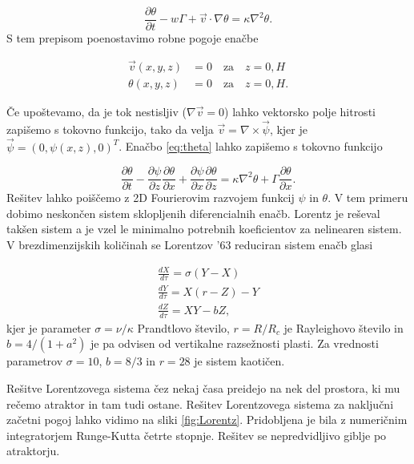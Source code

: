 \documentclass[slovene,11pt,a4paper]{article}
\begin{document}
\begin{equation}
    \frac{\partial \theta}{\partial t} - w\Gamma + \vec{v} \cdot \nabla \theta = \kappa \nabla^2 \theta.
    \label{eq:theta}
\end{equation}
S tem prepisom poenostavimo robne pogoje enačbe

\begin{eqnarray}
    \vec{v}(x, y, z) &= 0 \quad \text{za} \quad z = 0, H \\
    \theta (x, y, z) &= 0 \quad \text{za} \quad z = 0, H.
\end{eqnarray}

Če upoštevamo, da je tok nestisljiv ($\nabla \vec{v} = 0$) lahko vektorsko polje hitrosti zapišemo s tokovno funkcijo, tako da velja $\vec{v} = \nabla \times \vec{\psi}$, kjer je $\vec{\psi} = (0, \psi (x, z), 0)^T$. Enačbo \ref{eq:theta} lahko zapišemo s tokovno funkcijo

\begin{equation}
    \frac{\partial \theta}{\partial t} - \frac{\partial \psi}{\partial z} \frac{\partial \theta}{\partial x} + \frac{\partial \psi}{\partial x} \frac{\partial \theta}{\partial z} = \kappa \nabla^2 \theta + \Gamma \frac{\partial \theta}{\partial x}.
\end{equation}
Rešitev lahko poiščemo z 2D Fourierovim razvojem funkcij $\psi$ in $\theta$. V tem primeru dobimo neskončen sistem sklopljenih diferencialnih enačb. Lorentz je reševal takšen sistem a je vzel le minimalno potrebnih koeficientov za nelinearen sistem. V brezdimenzijskih količinah se Lorentzov '63 reduciran sistem enačb glasi

\begin{eqnarray}
    \frac{dX}{d \tau} = \sigma (Y - X) \\
    \frac{dY}{d \tau} = X(r - Z) - Y \\
    \frac{dZ}{d \tau} = XY - bZ,
\end{eqnarray}
kjer je parameter $\sigma = \nu / \kappa$ Prandtlovo število, $r = R/R_c$ je Rayleighovo število in $b = 4 / (1+a^2)$ je pa odvisen od vertikalne razsežnosti plasti. Za vrednosti parametrov $\sigma = 10$, $b = 8/3$ in $r = 28$ je sistem kaotičen.

Rešitve Lorentzovega sistema čez nekaj časa preidejo na nek del prostora, ki mu rečemo atraktor in tam tudi ostane. Rešitev Lorentzovega sistema za naključni začetni pogoj lahko vidimo na sliki \ref{fig:Lorentz}. Pridobljena je bila z numeričnim integratorjem Runge-Kutta četrte stopnje. Rešitev se nepredvidljivo giblje po atraktorju.
\end{document}
